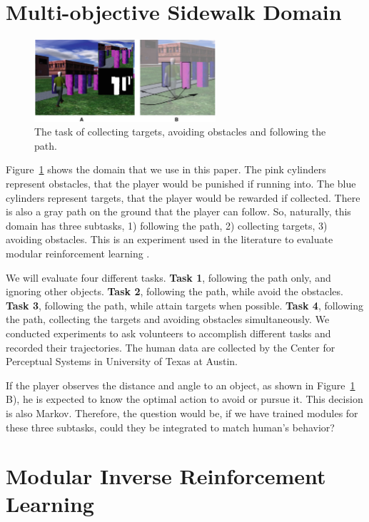 \documentclass[11pt]{article} %
\begin{document}
\section{Multi-objective Sidewalk Domain}
\label{sec:domain}

\begin{figure}[h!]
\centering
\includegraphics[width=0.6\textwidth]{avatar.png}
\caption{The task of collecting targets, avoiding obstacles and following the
path. \cite{rothkopf2013modular}}
\label{fig:avatar}
\end{figure}

Figure~\ref{fig:avatar} shows the domain that we use in this paper. The pink
cylinders represent obstacles, that the player would be punished if running
into. The blue cylinders represent targets, that the player would be rewarded if
collected. There is also a gray path on the ground that the player can follow.
So, naturally, this domain has three subtasks, 1) following the path, 2)
collecting targets, 3) avoiding obstacles. This is an experiment used in the
literature to evaluate modular reinforcement learning
\cite{rothkopf2013modular}.

We will evaluate four different tasks. {\bf Task 1}, following the path only, and
ignoring other objects. {\bf Task 2}, following the path, while avoid the obstacles.
{\bf Task 3}, following the path, while attain targets when possible. {\bf Task 4},
following the path, collecting the targets and avoiding obstacles
simultaneously.
We conducted experiments to ask volunteers to accomplish different tasks and
recorded their trajectories. The human data are collected by the Center for
Perceptual Systems in University of Texas at Austin.

If the player observes the distance and angle to an object, as shown in
Figure~\ref{fig:avatar} B), he is expected to know the optimal action to avoid
or pursue it. This decision is also Markov. Therefore, the question would be, if
we have trained modules for these three subtasks, could they be integrated to
match human's behavior?

\section{Modular Inverse Reinforcement Learning}
\label{sec:rl}
\end{document}
